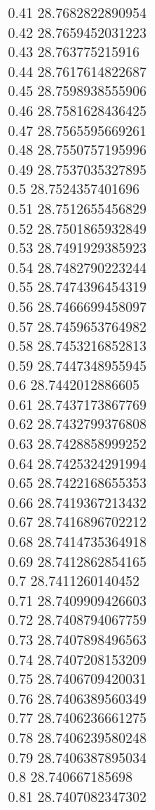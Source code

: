 {0.41	28.7682822890954\\
0.42	28.7659452031223\\
0.43	28.763775215916\\
0.44	28.7617614822687\\
0.45	28.7598938555906\\
0.46	28.7581628436425\\
0.47	28.7565595669261\\
0.48	28.7550757195996\\
0.49	28.7537035327895\\
0.5	28.7524357401696\\
0.51	28.7512655456829\\
0.52	28.7501865932849\\
0.53	28.7491929385923\\
0.54	28.7482790223244\\
0.55	28.7474396454319\\
0.56	28.7466699458097\\
0.57	28.7459653764982\\
0.58	28.7453216852813\\
0.59	28.7447348955945\\
0.6	28.7442012886605\\
0.61	28.7437173867769\\
0.62	28.7432799376808\\
0.63	28.7428858999252\\
0.64	28.7425324291994\\
0.65	28.7422168655353\\
0.66	28.7419367213432\\
0.67	28.7416896702212\\
0.68	28.7414735364918\\
0.69	28.7412862854165\\
0.7	28.7411260140452\\
0.71	28.7409909426603\\
0.72	28.7408794067759\\
0.73	28.7407898496563\\
0.74	28.7407208153209\\
0.75	28.7406709420031\\
0.76	28.7406389560349\\
0.77	28.7406236661275\\
0.78	28.7406239580248\\
0.79	28.7406387895034\\
0.8	28.740667185698\\
0.81	28.7407082347302\\
}
